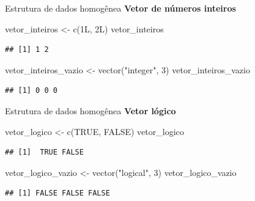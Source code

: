 \documentclass[
  10pt,
  ignorenonframetext,
]{beamer}
\newenvironment{Shaded}{}{}
\newcommand{\DecValTok}[1]{#1}
\newcommand{\KeywordTok}[1]{\textcolor[rgb]{0.00,0.00,1.00}{#1}}
\newcommand{\NormalTok}[1]{#1}
\newcommand{\OtherTok}[1]{\textcolor[rgb]{1.00,0.25,0.00}{#1}}
\newcommand{\StringTok}[1]{\textcolor[rgb]{0.00,0.50,0.50}{#1}}
\begin{document}
\begin{frame}[fragile]{Estrutura de dados homogênea}
\protect\hypertarget{estrutura-de-dados-homoguxeanea-2}{}
\textbf{Vetor de números inteiros}

\begin{Shaded}
\begin{Highlighting}[]
\NormalTok{vetor\_inteiros  \textless{}{-}}\StringTok{ }\KeywordTok{c}\NormalTok{(1L, 2L)}
\NormalTok{vetor\_inteiros}
\end{Highlighting}
\end{Shaded}

\begin{verbatim}
## [1] 1 2
\end{verbatim}

\begin{Shaded}
\begin{Highlighting}[]
\NormalTok{vetor\_inteiros\_vazio \textless{}{-}}\StringTok{ }\KeywordTok{vector}\NormalTok{(}\StringTok{"integer"}\NormalTok{, }\DecValTok{3}\NormalTok{)}
\NormalTok{vetor\_inteiros\_vazio}
\end{Highlighting}
\end{Shaded}

\begin{verbatim}
## [1] 0 0 0
\end{verbatim}
\end{frame}

\begin{frame}[fragile]{Estrutura de dados homogênea}
\protect\hypertarget{estrutura-de-dados-homoguxeanea-3}{}
\textbf{Vetor lógico}

\begin{Shaded}
\begin{Highlighting}[]
\NormalTok{vetor\_logico  \textless{}{-}}\StringTok{ }\KeywordTok{c}\NormalTok{(}\OtherTok{TRUE}\NormalTok{, }\OtherTok{FALSE}\NormalTok{)}
\NormalTok{vetor\_logico}
\end{Highlighting}
\end{Shaded}

\begin{verbatim}
## [1]  TRUE FALSE
\end{verbatim}

\begin{Shaded}
\begin{Highlighting}[]
\NormalTok{vetor\_logico\_vazio \textless{}{-}}\StringTok{ }\KeywordTok{vector}\NormalTok{(}\StringTok{"logical"}\NormalTok{, }\DecValTok{3}\NormalTok{)}
\NormalTok{vetor\_logico\_vazio}
\end{Highlighting}
\end{Shaded}

\begin{verbatim}
## [1] FALSE FALSE FALSE
\end{verbatim}
\end{frame}
\end{document}
